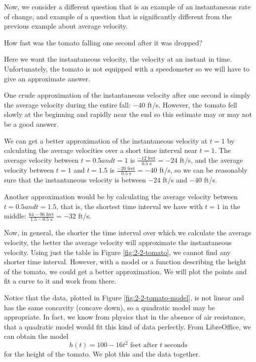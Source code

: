Now, we consider a different question that is an example of an instantaneous rate of change, and example of a question that is significantly different from the previous example about average velocity.
\begin{example}
    How fast was the tomato falling one second after it was dropped?

    \begin{solution}
    Here we want the instantaneous velocity, the velocity at an instant in time. Unfortunately, the tomato is not equipped with a speedometer so we will have to give an approximate answer.

    One crude approximation of the instantaneous velocity after one second is simply the average velocity during the entire fall: $-40$ ft/s. However, the tomato fell slowly at the beginning and rapidly near the end so this estimate may or may not be a good answer.

    We can get a better approximation of the instantaneous velocity at $t=1$ by calculating the average velocities over a short time interval near $t=1$. The average velocity between $t=0.5 and t=1$ is $\displaystyle\frac{-12 \mbox{ feet}}{0.5 \mbox{ s}} = -24$ ft/s, and the average velocity between $t=1$ and $t=1.5$ is $\displaystyle\frac{-20 \mbox{ feet}}{0.5 \mbox{ s}} = -40$ ft/s, so we can be reasonably sure that the instantaneous velocity is between $-24$ ft/s and $-40$ ft/s.

    Another approximation would be by calculating the average velocity between $t=0.5 and t=1.5$, that is, the shortest time interval we have with $t=1$ in the middle: $\displaystyle\frac{64-96 \mbox{ feet}}{1.5-0.5 \mbox{ s}} = -32$ ft/s.

     Now, in general, the shorter the time interval over which we calculate the average velocity, the better the average velocity will approximate the instantaneous velocity. Using just the table in Figure \ref{fig:2-2-tomato}, we cannot find any shorter time interval. However, with a model or a function describing the height of the tomato, we could get a better approximation. We will plot the points and fit a curve to it and work from there.

    Notice that the data, plotted in Figure \ref{fig:2-2-tomato-model}, is not linear and has the same concavity (concave down), so a quadratic model may be appropriate. In fact, we know from physics that in the absence of air resistance, that a quadratic model would fit this kind of data perfectly. From LibreOffice, we can obtain the model
$$h(t) = 100 - 16t^2 \mbox{ feet after } t \mbox{ seconds}$$
for the height of the tomato. We plot this and the data together.


\end{solution}
\end{example}
